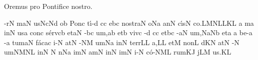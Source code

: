 \beginhymn Oremus pro Pontifice nostro.

\nosolesmescustos
{}
\Internote
\initiumgregorianum
{}%
\sgn {}-r\punctum N\egn
{}m\clivis aN\egn
\sgn {}us\pes Nc\augmentumduplex Nd\egn
\spatium
{}o{}\punctum b\egn
\spatium
\sgn Pon\engl{}\punctum c\egn
\sgn t{\'\i}-\punctum d\egn
{}c\punctum c\egn
\sgn {}e{}\pes bc\egn
\spatium
\sgn no{str}\clivis aN\egn
\sgn {}o{}\pes Na\egn
\spatium
{}an\punctum N\egn
\sgn c{\'\i}s\punctum N\egn
\sgn co.\pes LM\spatiumparvum\clivis NL\spatiumparvum\punctum L\spatiumparvum\punctum K\augmentum L\egn
\spatium
\divisiofinalis
\custos a
\lineaproxima
{}m\punctum a\egn
\sgn {}in\punctum N\egn
\sgn {}us\punctum a\egn
\spatium
\sgn con\punctum c\egn
\sgn s{\'e}{rv}\clivis cb\egn
\sgn {}et\clivis aN\egn
\spatium
{}-\pes bc\egn
\sgn {}u{m,}\punctum a\augmentum b\egn
\spatium
\divisiominor
\spatium
\sgn {}et\punctum b\egn
\spatium
\sgn viv\punctum c\egn
\sgn {}{\'\i}-\punctum d\egn
{}c\punctum c\egn
\sgn {}et\pes bc\egn
\spatium
{}-\clivis aN\egn
\sgn {}u{m,}\pes Na\augmentumduplex Nb\egn
\spatium
\divisiominor
\spatium
\sgn {}et\punctum a\egn
\spatium
\custos a
\lineaproxima
\sgn be-\punctum a\egn
{}-\punctum a\egn
\sgn tum\clivis aN\egn
\spatium
\sgn f{\'a}c\pes ac\egn
\sgn {}i-\punctum N\egn
\sgn {}at\punctum N\egn
\spatium
{}-\clivis NM\egn
\sgn {}um\pes Na\egn
\spatium
\sgn {}in\punctum N\egn
\spatium
\sgn t{e}{rr}\punctum L\augmentum L\egn
\sgn {}a,\punctum L\augmentum L\egn
\spatium
\divisiomaior
\spatium
\sgn {}et\punctum M\egn
\spatium
\sgn non\punctum L\egn
\spatium
{}d\pes KN\egn
\sgn {}at\punctum N\egn
\spatium
{}-\punctum N\egn
\sgn {}um\clivis NM\augmentumduplex NL\egn
\spatium
\divisiominor
\spatium
\sgn {}in\punctum N\egn
\spatium
\custos N
\lineaproxima
{}n\pes Na\egn
\sgn {}im\punctum N\egn
\sgn {}am\punctum N\egn
\spatium
\sgn {}in\punctum N\egn
\sgn {}im\punctum N\egn
\sgn {}i-\punctum N\egn
\sgn c{\'o}-\climacus NML\egn
\sgn rum\clivis KJ\egn
\spatium
{}j\pes LM\egn
\sgn {}u{s.}\punctum K\augmentum L\egn
\Finisgregoriana

\bigskip

